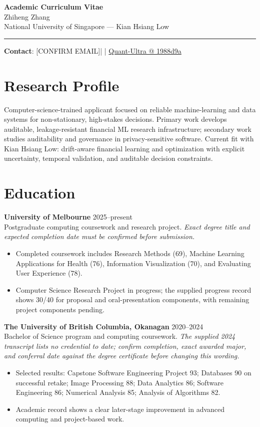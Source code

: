 \documentclass[11pt]{article}
\makeatletter
\newcommand{\ApplicantName}{Zhiheng Zhang}
\newcommand{\ApplicantEmail}{[CONFIRM EMAIL]}
\newcommand{\ApplicantPhone}{[CONFIRM PHONE]}
\newcommand{\ApplicantGitHub}{\href{https://github.com/zhiheng-zhang-Mera/Quant-Ultra/tree/1988d9a8530da91a8158de864d098ea869098923}{Quant-Ultra @ 1988d9a}}
\makeatother
\begin{document}
\begin{center}
{\LARGE\bfseries Academic Curriculum Vitae}\\[0.25em]
{\large \ApplicantName}\\
National University of Singapore --- Kian Hsiang Low
\end{center}
\vspace{0.35em}\hrule\vspace{0.65em}

\textbf{Contact}: \ApplicantEmail\quad | \quad \ApplicantPhone\quad | \quad \ApplicantGitHub

\section*{Research Profile}
Computer-science-trained applicant focused on reliable machine-learning and data systems for non-stationary, high-stakes decisions. Primary work develops auditable, leakage-resistant financial ML research infrastructure; secondary work studies auditability and governance in privacy-sensitive software. Current fit with Kian Hsiang Low: drift-aware financial learning and optimization with explicit uncertainty, temporal validation, and auditable decision constraints.

\section*{Education}
\textbf{University of Melbourne} \hfill 2025--present\\
Postgraduate computing coursework and research project. \textit{Exact degree title and expected completion date must be confirmed before submission.}
\begin{itemize}
\item Completed coursework includes Research Methods (69), Machine Learning Applications for Health (76), Information Visualization (70), and Evaluating User Experience (78).
\item Computer Science Research Project in progress; the supplied progress record shows 30/40 for proposal and oral-presentation components, with remaining project components pending.
\end{itemize}

\textbf{The University of British Columbia, Okanagan} \hfill 2020--2024\\
Bachelor of Science program and computing coursework. \textit{The supplied 2024 transcript lists no credential to date; confirm completion, exact awarded major, and conferral date against the degree certificate before changing this wording.}
\begin{itemize}
\item Selected results: Capstone Software Engineering Project 93; Databases 90 on successful retake; Image Processing 88; Data Analytics 86; Software Engineering 86; Numerical Analysis 85; Analysis of Algorithms 82.
\item Academic record shows a clear later-stage improvement in advanced computing and project-based work.
\end{itemize}
\end{document}
